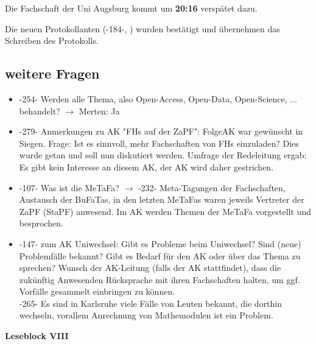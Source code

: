     \begin{info}{}
      Die Fachschaft der Uni Augsburg kommt um \textbf{20:16} verspätet dazu.
    \end{info}

    \begin{info}{}
      Die neuen Protokollanten (-184-, ) wurden bestätigt und übernehmen das Schreiben des Protokolls.
    \end{info}

  \subsection{weitere Fragen}
    \begin{itemize}
      \item -254- Werden alle Thema, also Open-Access, Open-Data, Open-Science, ... behandelt? $\rightarrow$ Merten: Ja
      \item -279- Anmerkungen zu AK "FHs auf der ZaPF": FolgeAK war gewünscht in Siegen. Frage: Ist es sinnvoll, mehr Fachschaften von FHs einzuladen?
        Dies wurde getan und soll nun diskutiert werden. Umfrage der Redeleitung ergab: Es gibt kein Interesse an diesem AK, der AK wird daher gestrichen.
      \item -107- Was ist die MeTaFa? $\rightarrow$ -232- Meta-Tagungen der Fachschaften, Austausch der BuFaTas, in den letzten MeTaFas
        waren jeweils Vertreter der ZaPF (StaPF) anwesend. Im AK werden Themen der MeTaFa vorgestellt und besprochen.
      \item -147- zum AK Uniwechsel: Gibt es Probleme beim Uniwechsel? Sind (neue) Problemfälle bekannt? Gibt es Bedarf für den AK oder über das Thema zu sprechen?
        Wunsch der AK-Leitung (falls der AK stattfindet), dass die zukünftig Anwesenden Rücksprache mit ihren Fachschaften halten, um ggf. Vorfälle gesammelt einbringen zu können. \\
        -265- Es sind in Karlsruhe viele Fälle von Leuten bekannt, die dorthin wechseln, vorallem Anrechnung von Mathemodulen ist ein Problem.
    \end{itemize}

    \textbf{Leseblock VIII} \\

